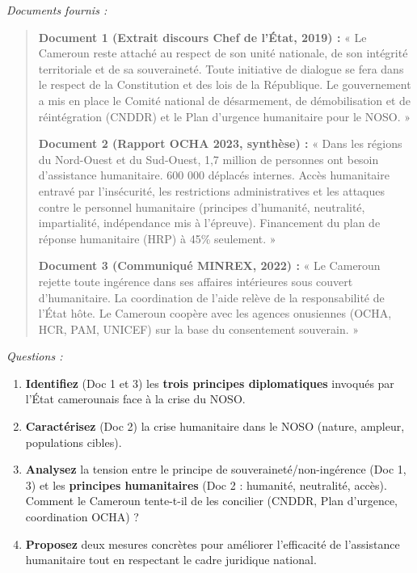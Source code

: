 \documentclass[11pt]{article}
\newcommand{\cle}[1]{{\popxbold\color{popdark}#1}}
\begin{document}
\begin{exercice}
\emph{Documents fournis :}
\begin{quote}
\textbf{Document 1 (Extrait discours Chef de l'État, 2019) :} « Le Cameroun reste attaché au respect de son unité nationale, de son intégrité territoriale et de sa souveraineté. Toute initiative de dialogue se fera dans le respect de la Constitution et des lois de la République. Le gouvernement a mis en place le Comité national de désarmement, de démobilisation et de réintégration (CNDDR) et le Plan d'urgence humanitaire pour le NOSO. »

\textbf{Document 2 (Rapport OCHA 2023, synthèse) :} « Dans les régions du Nord-Ouest et du Sud-Ouest, 1,7 million de personnes ont besoin d'assistance humanitaire. 600 000 déplacés internes. Accès humanitaire entravé par l'insécurité, les restrictions administratives et les attaques contre le personnel humanitaire (principes d'humanité, neutralité, impartialité, indépendance mis à l'épreuve). Financement du plan de réponse humanitaire (HRP) à 45\% seulement. »

\textbf{Document 3 (Communiqué MINREX, 2022) :} « Le Cameroun rejette toute ingérence dans ses affaires intérieures sous couvert d'humanitaire. La coordination de l'aide relève de la responsabilité de l'État hôte. Le Cameroun coopère avec les agences onusiennes (OCHA, HCR, PAM, UNICEF) sur la base du consentement souverain. »
\end{quote}
\emph{Questions :}
\begin{enumerate}
    \item \textbf{Identifiez} (Doc 1 et 3) les \textbf{trois principes diplomatiques} invoqués par l'État camerounais face à la crise du NOSO.
    \item \textbf{Caractérisez} (Doc 2) la \cle{crise humanitaire} dans le NOSO (nature, ampleur, populations cibles).
    \item \textbf{Analysez} la tension entre le principe de \cle{souveraineté/non-ingérence} (Doc 1, 3) et les \textbf{principes humanitaires} (Doc 2 : humanité, neutralité, accès). Comment le Cameroun tente-t-il de les concilier (CNDDR, Plan d'urgence, coordination OCHA) ?
    \item \textbf{Proposez} deux mesures concrètes pour améliorer l'\cle{efficacité de l'assistance humanitaire} tout en respectant le cadre juridique national.
\end{enumerate}
\end{exercice}
\end{document}
